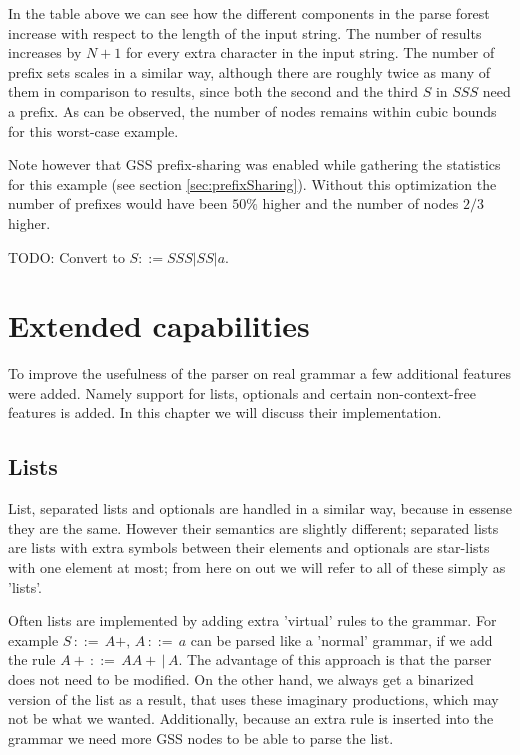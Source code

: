 \documentclass[a4paper,10pt]{article}
\begin{document}
In the table above we can see how the different components in the parse forest increase with respect to the length of the input string. The number of results increases by $N + 1$ for every extra character in the input string. The number of prefix sets scales in a similar way, although there are roughly twice as many of them in comparison to results, since both the second and the third $S$ in $SSS$ need a prefix. As can be observed, the number of nodes remains within cubic bounds for this worst-case example.

Note however that GSS prefix-sharing was enabled while gathering the statistics for this example (see section \ref{sec:prefixSharing}). Without this optimization the number of prefixes would have been $50\%$ higher and the number of nodes $2/3$ higher.

TODO: Convert to $S ::= SSS | SS | a$.

\section{Extended capabilities}

To improve the usefulness of the parser on real grammar a few additional features were added. Namely support for lists, optionals and certain non-context-free features is added. In this chapter we will discuss their implementation.

\subsection{Lists}

List, separated lists and optionals are handled in a similar way, because in essense they are the same. However their semantics are slightly different; separated lists are lists with extra symbols between their elements and optionals are star-lists with one element at most; from here on out we will refer to all of these simply as 'lists'.

Often lists are implemented by adding extra 'virtual' rules to the grammar. For example $S\,::=\,A+,\,A\,::=\,a$ can be parsed like a 'normal' grammar, if we add the rule $A+\,::=\,AA+\,|\,A$. The advantage of this approach is that the parser does not need to be modified. On the other hand, we always get a binarized version of the list as a result, that uses these imaginary productions, which may not be what we wanted. Additionally, because an extra rule is inserted into the grammar we need more GSS nodes to be able to parse the list.
\end{document}
